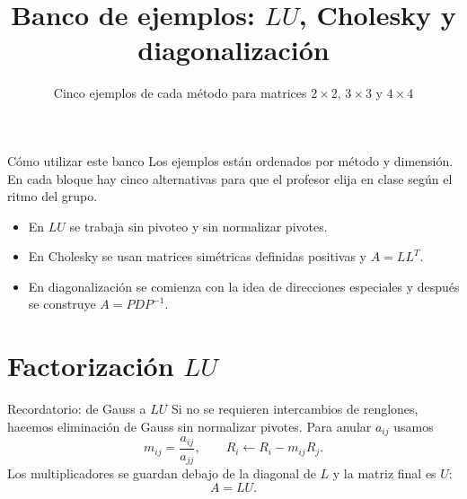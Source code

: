 \documentclass[aspectratio=169,10pt]{beamer}
\title{Banco de ejemplos: $LU$, Cholesky y diagonalización}
\subtitle{Cinco ejemplos de cada método para matrices $2\times2$, $3\times3$ y $4\times4$}
\author{}
\date{}
\begin{document}
\begin{frame}\titlepage\end{frame}
\begin{frame}{Cómo utilizar este banco}
\small
Los ejemplos están ordenados por método y dimensión. En cada bloque hay cinco alternativas para que el profesor elija en clase según el ritmo del grupo.
\begin{itemize}
\item En $LU$ se trabaja \alert{sin pivoteo} y sin normalizar pivotes.
\item En Cholesky se usan matrices simétricas definidas positivas y $A=LL^T$.
\item En diagonalización se comienza con la idea de direcciones especiales y después se construye $A=PDP^{-1}$.
\end{itemize}
\end{frame}
\section{Factorización $LU$}
\begin{frame}{Recordatorio: de Gauss a $LU$}
\small
Si no se requieren intercambios de renglones, hacemos eliminación de Gauss sin normalizar pivotes. Para anular $a_{ij}$ usamos
\[
m_{ij}=\frac{a_{ij}}{a_{jj}},\qquad R_i\leftarrow R_i-m_{ij}R_j.
\]
Los multiplicadores se guardan debajo de la diagonal de $L$ y la matriz final es $U$:
\[
\boxed{A=LU}.
\]
\end{frame}
\end{document}
